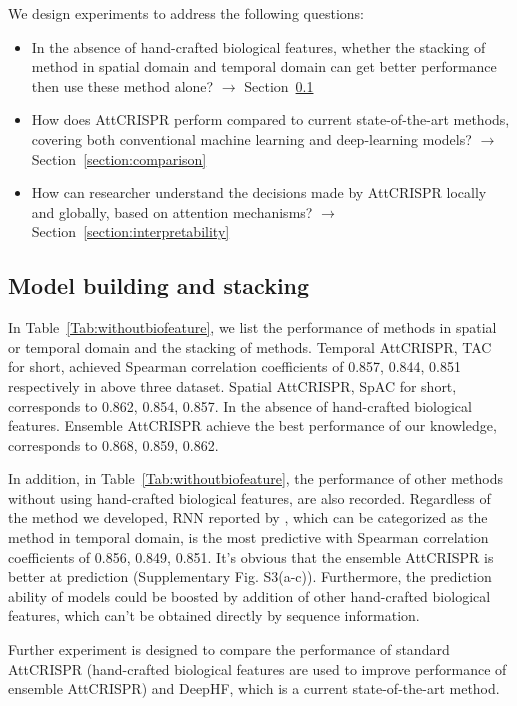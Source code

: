 \documentclass{bioinfo}
\begin{document}
We design experiments to address the following questions:
\begin{itemize}
    \item 
    In the absence of hand-crafted biological features, whether the stacking of method in spatial domain and temporal domain can get better performance then use these method alone? 
    $\rightarrow$ Section~\ref{section:stacking}
    \item 
    How does AttCRISPR perform compared to current state-of-the-art methods, covering both conventional machine learning and deep-learning models? 
    $\rightarrow$ Section~\ref{section:comparison}
    \item 
    How can researcher understand the decisions made by AttCRISPR locally and globally, based on attention mechanisms? 
    $\rightarrow$ Section~\ref{section:interpretability}
    \vspace*{1pt}
\end{itemize}

\subsection{Model building and stacking}\label{section:stacking}

In Table~\ref{Tab:withoutbiofeature}, we list the performance of methods in spatial or temporal domain and the stacking of methods. 
Temporal AttCRISPR, TAC for short, achieved Spearman correlation coefficients of 0.857, 0.844, 0.851 respectively in above three dataset. 
Spatial AttCRISPR, SpAC for short, corresponds to 0.862, 0.854, 0.857. In the absence of hand-crafted biological features. 
Ensemble AttCRISPR achieve the best performance of our knowledge, corresponds to 0.868, 0.859, 0.862. 

In addition, in Table~\ref{Tab:withoutbiofeature}, the performance of other methods without using hand-crafted biological features, are also recorded. 
Regardless of the method we developed, RNN reported by \citeauthor{wang2019optimized}, which can be categorized as the method in temporal domain, 
is the most predictive with Spearman correlation coefficients of 0.856, 0.849, 0.851. 
It's obvious that the ensemble AttCRISPR is better at prediction (Supplementary Fig. S3(a-c)). 
Furthermore, the prediction ability of models could be boosted by addition of other hand-crafted biological features, which can't be obtained directly by sequence information. 

Further experiment is designed to compare the performance of standard AttCRISPR (hand-crafted biological features are used to improve performance of ensemble AttCRISPR)
 and DeepHF, which is a current state-of-the-art method.\vspace*{-10pt}
\end{document}
